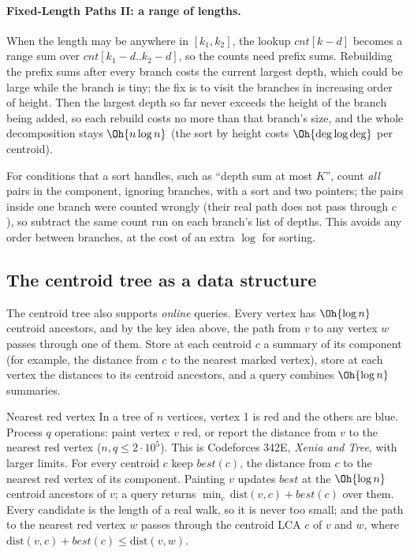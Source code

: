\paragraph{Fixed-Length Paths II: a range of lengths.} When the length may be anywhere in $[k_1, k_2]$, the lookup
$\mathit{cnt}[k - d]$ becomes a range sum over $\mathit{cnt}[k_1 - d .. k_2 - d]$, so the counts need prefix sums. Rebuilding the
prefix sums after every branch costs the current largest depth, which could be large while the branch is tiny; the fix is to
visit the branches in increasing order of height. Then the largest depth so far never exceeds the height of the branch being
added, so each rebuild costs no more than that branch's size, and the whole decomposition stays $\Oh{n \log n}$ (the sort by
height costs $\Oh{\deg \log \deg}$ per centroid).

\begin{trick}
For conditions that a sort handles, such as ``depth sum at most $K$'', count \emph{all} pairs in the component, ignoring branches,
with a sort and two pointers; the pairs inside one branch were counted wrongly (their real path does not pass through $c$), so
subtract the same count run on each branch's list of depths. This avoids any order between branches, at the cost of
an extra $\log$ for sorting.
\end{trick}

\subsection{The centroid tree as a data structure}

The centroid tree also supports \emph{online} queries. Every vertex has $\Oh{\log n}$ centroid ancestors, and by the key idea
above, the path from $v$ to any vertex $w$ passes through one of them. Store at each centroid $c$ a summary of its component
(for example, the distance from $c$ to the nearest marked vertex), store at each vertex the distances to its centroid ancestors,
and a query combines $\Oh{\log n}$ summaries.

\begin{problem}{Nearest red vertex}
In a tree of $n$ vertices, vertex 1 is red and the others are blue. Process $q$ operations: paint vertex $v$ red, or report the
distance from $v$ to the nearest red vertex ($n, q \le 2 \cdot 10^5$). This is Codeforces 342E, \emph{Xenia and Tree}, with
larger limits.
\solution For every centroid $c$ keep $\mathit{best}(c)$, the distance from $c$ to the nearest red vertex of its component. Painting
$v$ updates $\mathit{best}$ at the $\Oh{\log n}$ centroid ancestors of $v$; a query returns $\min_c\, \mathrm{dist}(v, c) +
\mathit{best}(c)$ over them. Every candidate is the length of a real walk, so it is never too small; and the path to the nearest
red vertex $w$ passes through the centroid LCA $c$ of $v$ and $w$, where $\mathrm{dist}(v, c) + \mathit{best}(c) \le
\mathrm{dist}(v, w)$.
\end{problem}

